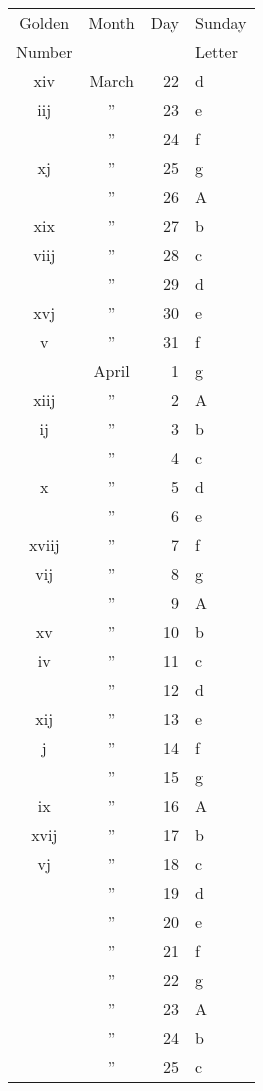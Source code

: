 {\begin{multicols}{2}
{\tiny
\noindent\begin{tabular} { @{}c@{\hspace{.15cm}} c@{\hspace{.2cm}} r@{\hspace{.2cm}} l@{\hspace{.2cm}} }
Golden & Month & Day & Sunday \\
Number &    &   & Letter \\
\hline
xiv & March & 22 & d \\
iij & ” & 23 & e \\
    & ” & 24 & f \\
xj  & ” & 25 & g \\
    & ” & 26 & A \\
xix & ” & 27 & b \\
viij & ” & 28 & c \\
    & ” & 29 & d \\
xvj & ” & 30 & e \\
v   & ” & 31 & f \\
    & April & 1 & g \\
xiij & ” & 2 & A\\
ij & ” & 3 & b\\
  & ” & 4 & c \\
x &	”	&5&	d\\
&”	&6&	e\\
xviij	&”&	7&	f\\
vij	&”&	8&	g\\
&”	&9&	A\\
xv	&”&	10&	b\\
iv	&”&	11&	c\\
&”	&12&	d\\
xij	&”&	13&	e\\
j	&”&	14&	f\\
&”	&15&	g\\
ix	&”&	16&	A\\
xvij	&”&	17&	b\\
vj	&”&	18&	c\\
&”	&19&	d\\
&”	&20&	e\\
&”	&21&	f\\
&”	&22&	g\\
&”	&23&	A\\
&”	&24&	b\\
&”	&25&	c\\

\end{tabular}}
\footnotesize
\vspace{6pt}


\end{multicols}}
